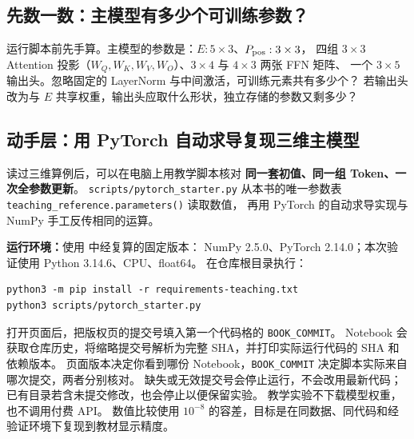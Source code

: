 \subsection{先数一数：主模型有多少个可训练参数？}
\label{app:parameter-count}

运行脚本前先手算。主模型的参数是：$E:5\times3$、$P_{\rm pos}:3\times3$，
四组 $3\times3$ Attention 投影（$W_Q,W_K,W_V,W_O$）、$3\times4$ 与 $4\times3$ 两张 FFN 矩阵、
一个 $3\times5$ 输出头。忽略固定的 LayerNorm 与中间激活，可训练元素共有多少个？
若输出头改为与 $E$ 共享权重，输出头应取什么形状，独立存储的参数又剩多少？

\par

\subsection{动手层：用 PyTorch 自动求导复现三维主模型}
\label{app:pytorch-lab}

读过三维算例后，可以在电脑上用教学脚本核对
\textbf{同一套初值、同一组 Token、一次全参数更新}。
\texttt{scripts/pytorch\_starter.py} 从本书的唯一参数表
\texttt{teaching\_reference.parameters()} 读取数值，
再用 PyTorch 的自动求导实现与 NumPy 手工反传相同的运算。

\textbf{运行环境：}使用  中经复算的固定版本：
NumPy 2.5.0、PyTorch 2.14.0；本次验证使用 Python 3.14.6、CPU、float64。
在仓库根目录执行：
\begin{verbatim}
python3 -m pip install -r requirements-teaching.txt
python3 scripts/pytorch_starter.py
\end{verbatim}
\noindent 打开页面后，把版权页的提交号填入第一个代码格的 \texttt{BOOK\_COMMIT}。
Notebook 会获取仓库历史，将缩略提交号解析为完整 SHA，并打印实际运行代码的 SHA 和依赖版本。
页面版本决定你看到哪份 Notebook，\texttt{BOOK\_COMMIT} 决定脚本实际来自哪次提交，两者分别核对。
缺失或无效提交号会停止运行，不会改用最新代码；已有目录若含未提交修改，也会停止以便保留实验。
教学实验不下载模型权重，也不调用付费 API。
数值比较使用 $10^{-8}$ 的容差，目标是在同数据、同代码和经验证环境下复现到教材显示精度。

